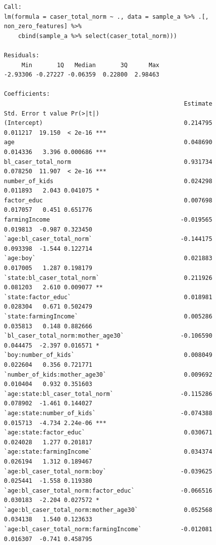 \documentclass{article}
\begin{document}
\begin{figure}[H]
\begin{lstlisting}[style=RstyleCommentSmall, caption=CATE with Controls selected by LASSO]
Call:
lm(formula = caser_total_norm ~ ., data = sample_a %>% .[, non_zero_features] %>% 
    cbind(sample_a %>% select(caser_total_norm)))

Residuals:
     Min       1Q   Median       3Q      Max 
-2.93306 -0.27227 -0.06359  0.22800  2.98463 

Coefficients:
                                                   Estimate Std. Error t value Pr(>|t|)    
(Intercept)                                        0.214795   0.011217  19.150  < 2e-16 ***
age                                                0.048690   0.014336   3.396 0.000686 ***
bl_caser_total_norm                                0.931734   0.078250  11.907  < 2e-16 ***
number_of_kids                                     0.024298   0.011893   2.043 0.041075 *  
factor_educ                                        0.007698   0.017057   0.451 0.651776    
farmingIncome                                     -0.019565   0.019813  -0.987 0.323450    
`age:bl_caser_total_norm`                         -0.144175   0.093398  -1.544 0.122714    
`age:boy`                                          0.021883   0.017005   1.287 0.198179    
`state:bl_caser_total_norm`                        0.211926   0.081203   2.610 0.009077 ** 
`state:factor_educ`                                0.018981   0.028304   0.671 0.502479    
`state:farmingIncome`                              0.005286   0.035813   0.148 0.882666    
`bl_caser_total_norm:mother_age30`                -0.106590   0.044475  -2.397 0.016571 *  
`boy:number_of_kids`                               0.008049   0.022604   0.356 0.721771    
`number_of_kids:mother_age30`                      0.009692   0.010404   0.932 0.351603    
`age:state:bl_caser_total_norm`                   -0.115286   0.078902  -1.461 0.144027    
`age:state:number_of_kids`                        -0.074388   0.015713  -4.734 2.24e-06 ***
`age:state:factor_educ`                            0.030671   0.024028   1.277 0.201817    
`age:state:farmingIncome`                          0.034374   0.026194   1.312 0.189467    
`age:bl_caser_total_norm:boy`                     -0.039625   0.025441  -1.558 0.119380    
`age:bl_caser_total_norm:factor_educ`             -0.066516   0.030183  -2.204 0.027572 *  
`age:bl_caser_total_norm:mother_age30`             0.052568   0.034138   1.540 0.123633    
`age:bl_caser_total_norm:farmingIncome`           -0.012081   0.016307  -0.741 0.458795    

\end{lstlisting}
\end{figure}
\end{document}
